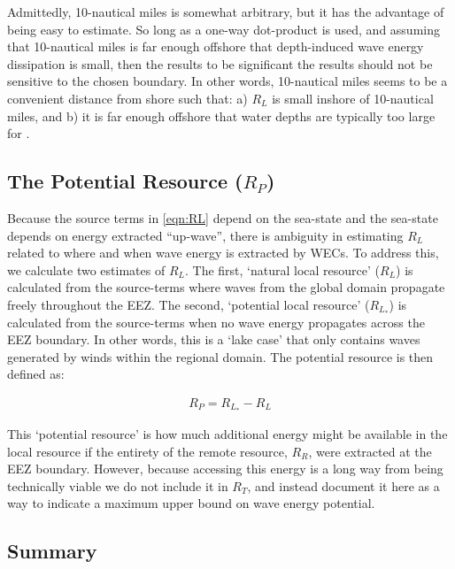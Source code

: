 Admittedly, 10-nautical miles is somewhat arbitrary, but it has the advantage of being easy to estimate. So long as a one-way dot-product is used, and assuming that 10-nautical miles is far enough offshore that depth-induced wave energy dissipation is small, then the results to be significant the results should not be sensitive to the chosen boundary. In other words, 10-nautical miles seems to be a convenient distance from shore such that: a) $R_L$ is small inshore of 10-nautical miles, and b) it is far enough offshore that water depths are typically too large for .

\subsection{The Potential Resource ($R_P$)}

Because the source terms in \eqref{eqn:RL} depend on the sea-state and the sea-state depends on energy extracted ``up-wave'', there is ambiguity in estimating $R_L$ related to where and when wave energy is extracted by WECs. To address this, we calculate two estimates of $R_L$. The first, `natural local resource' ($R_L$) is calculated from the source-terms where waves from the global domain propagate freely throughout the EEZ. The second, `potential local resource' ($R_{L_*}$) is calculated from the source-terms when no wave energy propagates across the EEZ boundary. In other words, this is a `lake case' that only contains waves generated by winds within the regional domain. The potential resource is then defined as:

\begin{align}
    R_P = R_{L_*} - R_L
\end{align}

This `potential resource' is how much additional energy might be available in the local resource if the entirety of the remote resource, $R_R$, were extracted at the EEZ boundary. However, because accessing this energy is a long way from being technically viable we do not include it in $R_T$, and instead document it here as a way to indicate a maximum upper bound on wave energy potential.

\subsection{Summary}

